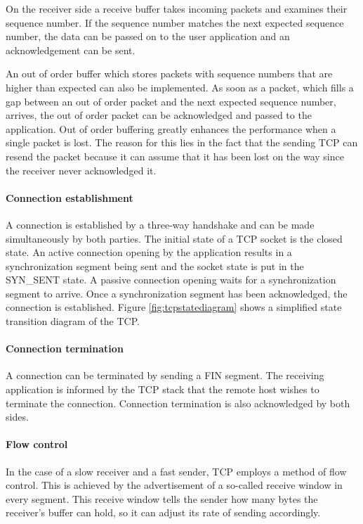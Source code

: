 \documentclass[11pt,twoside,abstract,notitlepage]{scrreprt}
\begin{document}
On the receiver side a receive buffer takes incoming packets and examines their sequence number. If the sequence number matches the next expected sequence number, the data can be passed on to the user application and an acknowledgement can be sent. 

An out of order buffer which stores packets with sequence numbers that are higher than expected can also be implemented. As soon as a packet, which fills a gap between an out of order packet and the next expected sequence number, arrives, the out of order packet can be acknowledged and passed to the application. Out of order buffering greatly enhances the performance when a single packet is lost. The reason for this lies in the fact that the sending TCP can resend the packet because it can assume that it has been lost on the way since the receiver never acknowledged it.

\paragraph{Connection establishment}
A connection is established by a three-way handshake and can be made simultaneously by both parties. The initial state of a TCP socket is the closed state. An active connection opening by the application results in a synchronization segment being sent and the socket state is put in the SYN\_SENT state. A passive connection opening waits for a synchronization segment to arrive. Once a synchronization segment has been acknowledged, the connection is established. Figure \ref{fig:tcpstatediagram} shows a simplified state transition diagram of the TCP. 

\paragraph{Connection termination}
A connection can be terminated by sending a FIN segment. The receiving application is informed by the TCP stack that the remote host wishes to terminate the connection. Connection termination is also acknowledged by both sides. 

\paragraph{Flow control}
In the case of a slow receiver and a fast sender, TCP employs a method of flow control. This is achieved by the advertisement of a so-called receive window in every segment. This receive window tells the sender how many bytes the receiver's buffer can hold, so it can adjust its rate of sending accordingly. 
\end{document}
